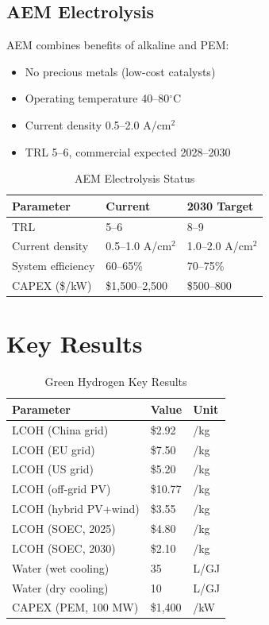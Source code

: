 \documentclass[12pt,twoside,openany]{book}
\newcommand{\unitdegree}{\ensuremath{^\circ\mathrm{C}}}
\begin{document}
\subsection{AEM Electrolysis}

AEM combines benefits of alkaline and PEM:
\begin{itemize}
    \item No precious metals (low-cost catalysts)
    \item Operating temperature 40--80\unitdegree
    \item Current density 0.5--2.0 A/cm$^2$
    \item TRL 5--6, commercial expected 2028--2030
\end{itemize}

\begin{table}[htbp]
    \centering
    \caption{AEM Electrolysis Status}
    \label{tab:aem_params}
    \begin{tabular}{L{4cm} C{3cm} C{3cm}}
    \hline
    \textbf{Parameter} & \textbf{Current} & \textbf{2030 Target} \\
    \hline
    TRL                    & 5--6           & 8--9               \\
    Current density        & 0.5--1.0 A/cm$^2$ & 1.0--2.0 A/cm$^2$ \\
    System efficiency      & 60--65\%       & 70--75\%           \\
    CAPEX (\$/kW)          & \$1,500--2,500 & \$500--800         \\
    \hline
    \end{tabular}
\end{table}

\section{Key Results}

\begin{table}[htbp]
    \centering
    \caption{Green Hydrogen Key Results}
    \label{tab:green_h2_results}
    \begin{tabular}{L{5cm} C{3cm} C{2cm}}
    \hline
    \textbf{Parameter} & \textbf{Value} & \textbf{Unit} \\
    \hline
    LCOH (China grid)    & \$2.92  & /kg \\
    LCOH (EU grid)       & \$7.50  & /kg \\
    LCOH (US grid)       & \$5.20  & /kg \\
    LCOH (off-grid PV)   & \$10.77 & /kg \\
    LCOH (hybrid PV+wind)& \$3.55  & /kg \\
    LCOH (SOEC, 2025)    & \$4.80  & /kg \\
    LCOH (SOEC, 2030)    & \$2.10  & /kg \\
    Water (wet cooling)  & 35      & L/GJ \\
    Water (dry cooling)  & 10      & L/GJ \\
    CAPEX (PEM, 100 MW)  & \$1,400 & /kW \\
    \hline
    \end{tabular}
\end{table}
\end{document}
